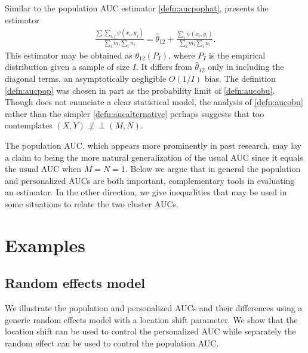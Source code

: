 \documentclass[12pt]{article}
\DeclareMathOperator{\AUC}{AUC}
\newcommand{\I}{I}
\renewcommand{\P}{P}
\newcommand{\cind}{\perp \!\!\! \perp}
\newcommand{\aucpop}{\theta_{12}}%
\newcommand{\aucpophat}{\hat{\theta}_{12}}%
\begin{document}
  Similar to the population AUC estimator \eqref{defn:aucpophat}, \cite{obuchowski1997} presents the estimator
  \begin{align}
  \frac{\sum\sum_{i,
      j}\psi(x_i,y_j)}{\sum_im_i\sum_in_i} = \aucpophat +\frac{\sum_i\psi(x_i,y_i)}{\sum_im_i\sum_in_i}.\label{defn:aucobu}
  \end{align}
   This estimator may be obtained as $\aucpop(\P_{\I})$, where
   $\P_{\I}$ is the empirical distribution given a sample of size
   $\I$. It differs from $\aucpophat$ only in including the diagonal
   terms, an asymptotically negligible $O(1/\I)$ bias. The definition
   \eqref{defn:aucpop} was chosen in part as the probability limit of
  \eqref{defn:aucobu}. Though \cite{obuchowski1997} does not enunciate
  a clear statistical model, the analysis of \eqref{defn:aucobu} rather
  than the simpler \eqref{defn:aucalternative} perhaps suggests that
  \cite{obuchowski1997} too contemplates $(X,Y)\not\cind (M,N)$.




  The population AUC, which appears more prominently in past research,
  may lay a claim to being the more natural generalization of the
  usual AUC since it equals the usual AUC when $M=N=1$. Below we argue
  that in general the population and personalized AUCs are both
  important, complementary tools in evaluating an estimator. In the
  other direction, we give inequalities that may be used in some
  situations to relate the two cluster AUCs.




\section{Examples}\label{section:examples} 

\subsection{Random effects model}\label{section:examples:random effects}
We illustrate the population and personalized AUCs
and their differences using a generic random effects model with a
location shift parameter. We show that the location shift can be
used to control the personalized AUC while separately the random effect can be used 
to control the population AUC.
\end{document}

